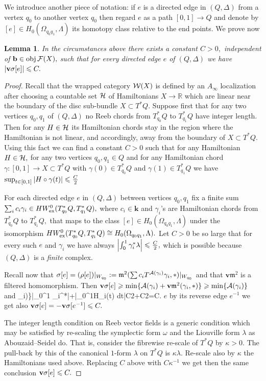 \documentclass{article}
\theoremstyle{plain}%
\newtheorem{lem}[thm]{Lemma}
\theoremstyle{definition}
\numberwithin{equation}{section}
\numberwithin{figure}{section}
\def\e#1\e{\begin{equation}#1\end{equation}}
\def\l{\label}
\def\fm{{\mathfrak m}}
\def\ge{\geqslant}
\def\le{\leqslant\nobreak}
\def\cA{{\mathbin{\cal A}}}
\def\cF{{\mathbin{\cal F}}}
\def\cH{{\mathbin{\cal H}}}
\def\cW{{\mathbin{\cal W}}}
\def\R{{\mathbin{\mathbb R}}}
\def\ga{\gamma}
\def\la{\lambda}
\def\ka{\kappa}
\def\si{\sigma}
\def\om{\omega}
\def\De{\Delta}
\def\La{\Lambda}
\def\Om{\Omega}
\def\iy{\infty}
\def\cm{\circ}
\def\k{{\mathbf{k}}}\def\b{{\mathbf{b}}}\def\x{{\mathbf{x}}}
\def\v{{\mathbf{v}}}\def\cl{{\rm cl}}\def\alg{{\rm alg}}\def\geom{{\rm geom}}\def\loc{{\rm loc}}\def\dirlim{\displaystyle\varinjlim}
\def\ex{{   {\rm ex}    }}\def\virt{{   {\rm virt}    }}\def\ev{{\rm ev}}\def\sing{{\rm sing}}\def\cont{{\rm cont}}
\begin{document}
We introduce another piece of notation: if $e$ is a directed edge in $(Q,\De)$ from a vertex $q_0$ to another vertex $q_0$ then regard $e$ as a path $[0,1]\to Q$ and denote by $[e]\in H_0(\Om_{q_0q_1},\La)$ its homotopy class relative to the end points. We prove now
\begin{lem}\l{lem: est for rep}
In the circumstances above there exists a constant $C>0,$ independent of $\b\in\obj\cF(X),$ such that for every directed edge $e$ of $(Q,\De)$ we have $|\v\si[e]|\le C.$
\end{lem}
\begin{proof}
Recall that the wrapped category $\cW(X)$ is defined by an $A_\iy$ localization after choosing a countable set $\cH$ of Hamiltonians $X\to\R$ which are linear near the boundary of the disc sub-bundle $X\subset T^*Q.$ Suppose first that for any two vertices $q_0,q_1$ of $(Q,\De)$ no Reeb chords from $T_{q_0}^*Q$ to $T_{q_1}^*Q$ have integer length. Then for any $H\in\cH$ its Hamiltonian chords stay in the region where the Hamiltonian is not linear, and accordingly, away from the boundary of $X\subset T^*Q.$ Using this fact we can find a constant $C>0$ such that for any Hamiltonian $H\in\cH,$ for any two vertices $q_0,q_1\in Q$ and for any Hamiltonian chord $\ga:[0,1]\to X\subset T^*Q$ with $\ga(0)\in T_{q_0}^*Q$ and $\ga(1)\in T_{q_1}^*Q$ we have $\sup_{t\in[0,1]}|H\cm \ga(t)| \le \frac C2$

For each directed edge $e$ in $(Q,\De)$ between vertices $q_0,q_1$ fix a finite sum $\sum_ic_i\ga_i\in HW_\ex^0(T_{q_0}^*Q,T_{q_1}^*Q),$ where $c_i\in\k$ and $\ga_i$'s are Hamiltonian chords from $T_{q_0}^*Q$ to $T_{q_1}^*Q,$ that maps to the class $[e]\in H_0(\Om_{q_0q_1},\La)$ under the isomorphism $HW_\ex^0(T_{q_0}^*Q,T_{q_1}^*Q)\cong H_0(\Om_{q_0q_1},\La).$ 
Let $C>0$ be so large that for every such $e$ and $\ga_i$ we have always $\left|\int_0^1 \ga_i^*\la\right|\le \frac C2,$ which is possible because $(Q,\De)$ is a {\it finite} complex.

Recall now that $\si [e]=(\rho [e])|_{W_{q_0}}:=\fm^2(\sum c_iT^{\cA(\ga_i)}\ga_i,*)|_{W_{q_0}}$ and that $\v\fm^2$ is a filtered homomorphism.
Then $\v\si [e]\ge \min\{\cA(\ga_i)+\v\fm^2(\ga_i,*)\}\ge \min\{\cA(\ga_i)\}$ and 
\e\l{v si} -\v \si[e]=\max\{-\cA(\ga_i)\}\le \left|\int_0^1 \ga_i^*\la\right|+\left|\int_0^1H\cm \ga_i(t) dt\right|\le \frac C2+\frac C2=C.\e
Replacing $e$ by its reverse edge $e^{-1}$ we get also $\v\si[e]=-\v\si[e^{-1}]\le C.$

The integer length condition on Reeb vector fields is a generic condition which may be satisfied by re-scaling the symplectic form $\om$ and the Liouville form $\la$ as Abouzaid--Seidel \cite[last pargraph of \S3.1]{AS} do. That is,  consider the fibrewise re-scale of $T^*Q$ by $\ka>0.$ The pull-back by this of the canonical $1$-form $\la$ on $T^*Q$ is $\ka\la.$ Re-scale also by $\ka$ the Hamiltonians used above. Replacing $C$ above with $C\ka^{-1}$ we get then the same conclusion  $\v\si[e]\le C.$
\end{proof}
\end{document}
